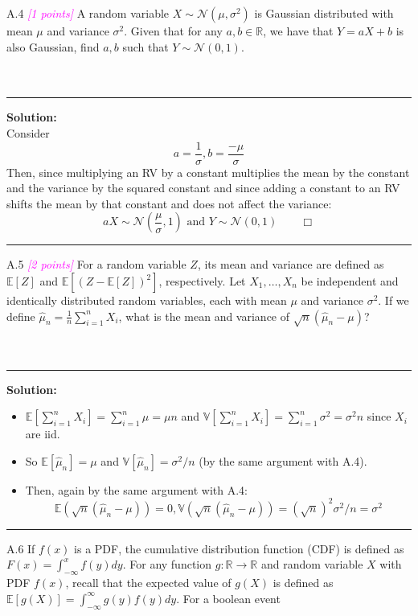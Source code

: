 \documentclass{article}
\newcommand{\field}[1]{\mathbb{#1}}
\newcommand{\1}{\mathbf{1}}
\newcommand{\E}{\mathbb{E}}
\newcommand{\V}{\mathbb{V}}
\newcommand{\R}{\field{R}} %
\newcommand{\points}[1]{\small\textcolor{magenta}{\emph{[#1 points]}} \normalsize}
\begin{document}
A.4 \points{1} A random variable $X \sim \mathcal{N}(\mu, \sigma^2)$ is Gaussian distributed with mean $\mu$ and variance $\sigma^2$. Given that for any $a,b \in \R$, we have that $Y = aX + b$ is also Gaussian, find $a,b$ such that $Y \sim \mathcal{N}(0,1)$.\\
\\
\\
    \noindent\rule{\textwidth}{1pt}
    {\bf Solution:}\\
    Consider $$\boxed{a = \frac{1}{\sigma}, b = \frac{-\mu}{\sigma}}$$ 
    Then, since multiplying an RV by a constant multiplies the mean by the constant and the variance by the squared constant and since adding a constant to an RV shifts the mean by that constant and does not affect the variance:
    $$
    aX \sim \mathcal{N}(\frac{\mu}{\sigma}, 1) \text{  and  } Y \sim \mathcal{N}(0,1) \qquad \Box
    $$
    \noindent\rule{\textwidth}{1pt}
A.5 \points{2} For a random variable $Z$, its mean and variance are defined as $\E[Z]$ and $\E[(Z-\E[Z])^2]$, respectively.
Let $X_1,\dots,X_n$ be independent and identically distributed random variables, each with mean $\mu$ and variance $\sigma^2$. 
If we define $\widehat{\mu}_n = \frac{1}{n} \sum_{i=1}^n X_i$, what is the mean and variance of $\sqrt{n}(\widehat{\mu}_n - \mu)$?\\
\\
\\
    \noindent\rule{\textwidth}{1pt}
    {\bf Solution:}\\
    \begin{itemize}
    \item $\E[\sum_{i=1}^n X_i] = \sum_{i=1}^n \mu = \mu n$ and $\V[\sum_{i=1}^n X_i] = \sum_{i=1}^n \sigma^2 = \sigma^2 n$ since $X_i$ are iid.
    
    \item So $\E[\widehat{\mu}_n] = \mu$ and $\V[\widehat{\mu}_n] = \sigma^2/n$ (by the same argument with A.4).
    \item Then, again by the same argument with A.4: $$\boxed{\E(\sqrt{n}(\widehat{\mu}_n - \mu)) = 0, \V(\sqrt{n}(\widehat{\mu}_n - \mu)) = (\sqrt{n})^2\sigma^2/n = \sigma^2}$$
    \end{itemize}
    \noindent\rule{\textwidth}{1pt}
A.6 If $f(x)$ is a PDF, the cumulative distribution function (CDF)
  is  defined as $F(x) = \int_{-\infty}^x f(y) dy$.  For any function
  $g : \R \rightarrow \R$ and random variable $X$ with PDF $f(x)$,
  recall that the expected value of $g(X)$ is defined as
  $\E[g(X)] = \int_{-\infty}^\infty g(y) f(y) dy$. For a boolean event
\end{document}
